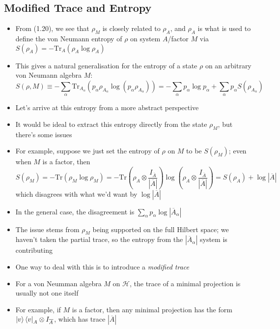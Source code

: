 \documentclass[12pt,a4paper]{article}
\numberwithin{equation}{section}
\newcommand{\ketbra}[2]{\ket{#1}\bra{#2}}
\newcommand{\ketbras}[1]{\ketbra{#1}{#1}}
\theoremstyle{definition}
\theoremstyle{theorem}
\begin{document}
	\subsection{Modified Trace and Entropy}
	\begin{itemize}
		\item From (1.20), we see that $\rho_{M}$ is closely related to $\rho_{A}$, and $\rho_{A}$ is what is used to define the von Neumann entropy of $\rho$ on system $A$/factor $M$ via $S(\rho_{A})=-\text{Tr}_{A}(\rho_{A}\log{\rho_{A}})$
		\item This gives a natural generalisation for the entropy of a state $\rho$ on an arbitrary von Neumann algebra $M$:
		\begin{equation}
			S(\rho,M)\equiv-\sum_{\alpha}\text{Tr}_{A_{\alpha}}\left(p_{\alpha}\rho_{A_{\alpha}}\log(p_{\alpha}\rho_{A_{\alpha}})\right)=-\sum_{\alpha}p_{\alpha}\log{p_{\alpha}}+\sum_{\alpha}p_{\alpha}S(\rho_{A_{\alpha}})
		\end{equation}
		\item Let's arrive at this entropy from a more abstract perspective
		\item It would be ideal to extract this entropy directly from the state $\rho_{M}$, but there's some issues
		\item For example, suppose we just set the entropy of $\rho$ on $M$ to be $S(\rho_{M})$; even when $M$ is a factor, then
		\begin{equation}
			S(\rho_{M})=-\text{Tr}(\rho_{M}\log{\rho_{M}})=-\text{Tr}\left(\rho_{A}\otimes\frac{I_{\overline{A}}}{|\overline{A}|}\right)\log\left(\rho_{A}\otimes\frac{I_{\overline{A}}}{|\overline{A}|}\right)=S(\rho_{A})+\log|\overline{A}|
		\end{equation}
		which disagrees with what we'd want by $\log|\overline{A}|$
		\item In the general case, the disagreement is $\sum_{\alpha}p_{\alpha}\log|\overline{A}_{\alpha}|$
		\item The issue stems from $\rho_{M}$ being supported on the full Hilbert space; we haven't taken the partial trace, so the entropy from the $|\overline{A}_{\alpha}|$ system is contributing
		\item One way to deal with this is to introduce a \textit{modified trace}
		\item For a von Neumman algebra $M$ on $\mathcal{H}$, the trace of a minimal projection is usually not one itself
		\item For example, if $M$ is a factor, then any minimal projection has the form $\ketbras{v}_{A}\otimes I_{\overline{A}}$, which has trace $|\overline{A}|$

\end{itemize}
\end{document}
